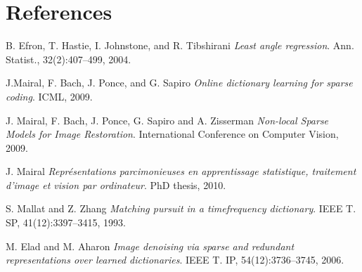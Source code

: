 \documentclass{ipol}
\begin{document}
\section{References}

\begin{thebibliography}{9}

	B. Efron, T. Hastie, I. Johnstone, and R. Tibshirani
	\emph{Least angle regression}. 
	Ann. Statist.,
	32(2):407–499,
	2004.

	J.Mairal, F. Bach, J. Ponce, and G. Sapiro
	\emph{Online dictionary learning for sparse coding}.
	ICML,
	2009.

	J. Mairal, F. Bach, J. Ponce, G. Sapiro and A. Zisserman
	\emph{ Non-local Sparse Models for Image Restoration}.
	International Conference on Computer Vision,
	2009.

	J. Mairal
	\emph{ Représentations parcimonieuses en apprentissage statistique, traitement d’image et
vision par ordinateur}.
	PhD thesis,
	2010.

	S. Mallat and Z. Zhang
 	\emph{Matching pursuit in a timefrequency dictionary}.
	IEEE T. SP,
	41(12):3397–3415,
	1993.

	M. Elad and M. Aharon
	\emph{Image denoising via sparse and redundant representations over learned dictionaries}.
	IEEE T.
	IP, 54(12):3736–3745,
	2006.

\end{thebibliography}
\end{document}
